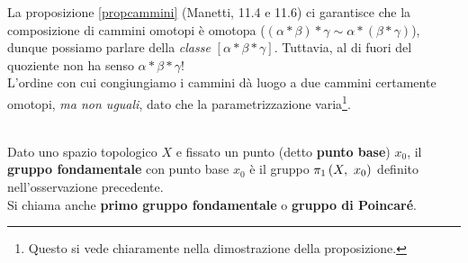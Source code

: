 \begin{attention}
	La proposizione \ref{propcammini} (Manetti, 11.4 e 11.6) ci garantisce che la composizione di cammini omotopi è omotopa ($\left(\alpha\ast\beta\right)\ast \gamma \sim \alpha\ast\left(\beta\ast\gamma\right)$), dunque possiamo parlare della \textit{classe} $\left[\alpha\ast\beta\ast\gamma\right]$. Tuttavia, al di fuori del quoziente non ha senso $\alpha\ast\beta\ast\gamma$!\\
	L'ordine con cui congiungiamo i cammini dà luogo a due cammini certamente omotopi, \textit{ma non uguali}, dato che la parametrizzazione varia\footnote{Questo si vede chiaramente nella dimostrazione della proposizione.}.
\end{attention}
\begin{define}~{}\\
	Dato uno spazio topologico $X$ e fissato un punto (detto \textbf{punto base}) $x_0$, il \textbf{gruppo fondamentale} con punto base $x_0$ è il gruppo $\gruf{X}{x_0}$ definito nell'osservazione precedente.\\
	Si chiama anche \textbf{primo gruppo fondamentale} o \textbf{gruppo di Poincaré}.
\end{define}
